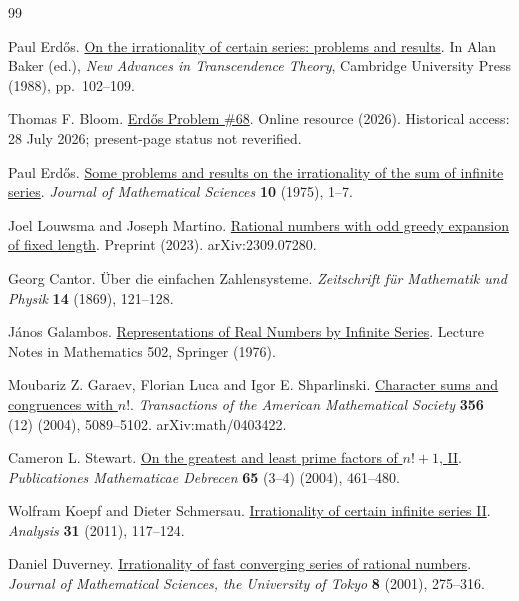 \begin{thebibliography}{99}

Paul Erd{\H o}s. \href{https://doi.org/10.1017/CBO9780511897184.009}{On the irrationality of certain series: problems and results}.
In Alan Baker (ed.), \emph{New Advances in Transcendence Theory}, Cambridge University Press (1988), pp.~102--109.

Thomas F. Bloom. \href{https://www.erdosproblems.com/68}{Erd{\H o}s Problem {\#68}}.
Online resource (2026). Historical access: 28 July 2026; present-page status not reverified.

Paul Erd{\H o}s. \href{https://www.renyi.hu/~p_erdos/1976-44.pdf}{Some problems and results on the irrationality of the sum of infinite series}.
\emph{Journal of Mathematical Sciences} \textbf{10} (1975), 1--7.

Joel Louwsma and Joseph Martino. \href{https://arxiv.org/abs/2309.07280v1}{Rational numbers with odd greedy expansion of fixed length}.
Preprint (2023). arXiv:2309.07280.

Georg Cantor. {\"U}ber die einfachen Zahlensysteme.
\emph{Zeitschrift f{\"u}r Mathematik und Physik} \textbf{14} (1869), 121--128.

J{\'a}nos Galambos. \href{https://doi.org/10.1007/BFb0081642}{Representations of Real Numbers by Infinite Series}.
Lecture Notes in Mathematics 502, Springer (1976).

Moubariz Z. Garaev, Florian Luca and Igor E. Shparlinski. \href{https://doi.org/10.1090/S0002-9947-04-03612-8}{Character sums and congruences with {$n!$}}.
\emph{Transactions of the American Mathematical Society} \textbf{356} (12) (2004), 5089--5102. arXiv:math/0403422.

Cameron L. Stewart. \href{https://doi.org/10.5486/PMD.2004.3190}{On the greatest and least prime factors of {$n!+1$}, {II}}.
\emph{Publicationes Mathematicae Debrecen} \textbf{65} (3--4) (2004), 461--480.

Wolfram Koepf and Dieter Schmersau. \href{https://doi.org/10.1524/anly.2011.1094}{Irrationality of certain infinite series {II}}.
\emph{Analysis} \textbf{31} (2011), 117--124.

Daniel Duverney. \href{https://www.ms.u-tokyo.ac.jp/journal/pdf/jms080206.pdf}{Irrationality of fast converging series of rational numbers}.
\emph{Journal of Mathematical Sciences, the University of Tokyo} \textbf{8} (2001), 275--316.


\end{thebibliography}
